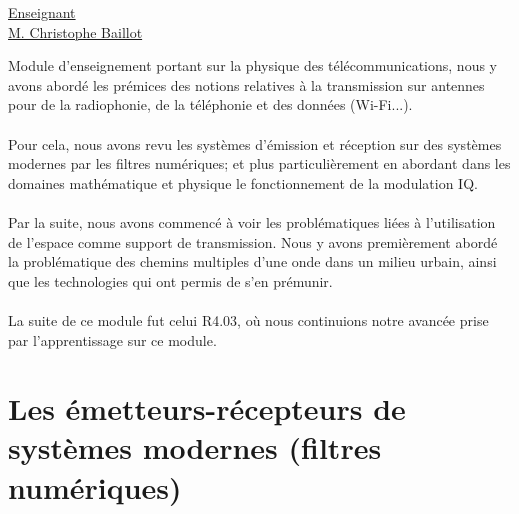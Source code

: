\renewcommand{\figurename}{}

\vspace*{0.2cm}%
      \large
      \href{}{\color{black}Enseignant\\M. Christophe Baillot}\\%
      \normalsize
\vspace*{0.5cm}%





Module d'enseignement portant sur la physique des télécommunications, nous y avons abordé les prémices des notions relatives à la transmission sur antennes pour de la radiophonie, de la téléphonie et des données (Wi-Fi...).
\\ \\
Pour cela, nous avons revu les systèmes d'émission et réception sur des systèmes modernes par les filtres numériques; et plus particulièrement en abordant dans les domaines mathématique et physique le fonctionnement de la modulation IQ.
\\ \\
Par la suite, nous avons commencé à voir les problématiques liées à l'utilisation de l'espace comme support de transmission. Nous y avons premièrement abordé la problématique des chemins multiples d'une onde dans un milieu urbain, ainsi que les technologies qui ont permis de s'en prémunir.
\\ \\
La suite de ce module fut celui R4.03, où nous continuions notre avancée prise par l'apprentissage sur ce module.

\section{Les émetteurs-récepteurs de systèmes modernes (filtres numériques)}

